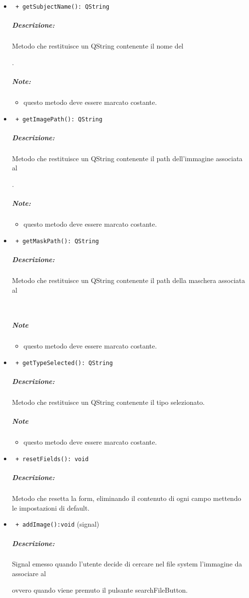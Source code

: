 \begin{itemize}
\item \color{blue}\verb! + getSubjectName(): QString!
\color{black}
\subparagraph{Descrizione: }Metodo che restituisce un QString contenente il nome del \subject{}. 
 \subparagraph{Note: }
 \begin{itemize}
 \item questo metodo deve essere marcato costante.
 \end{itemize}

\item \color{blue}\verb! + getImagePath(): QString!
\color{black}
\subparagraph{Descrizione: }Metodo che restituisce un QString contenente il path dell'immagine associata al \subject{}.
 \subparagraph{Note:}
 \begin{itemize}
 \item questo metodo deve essere marcato costante.
 \end{itemize}

\item \color{blue}\verb! + getMaskPath(): QString!
\color{black}
\subparagraph{Descrizione: }
 Metodo che restituisce un QString contenente il path della maschera associata al \subject{} \\
 \subparagraph{Note}
 \begin{itemize}
 \item questo metodo deve essere marcato costante.
 \end{itemize}

\item \color{blue}\verb! + getTypeSelected(): QString!
\color{black}
\subparagraph{Descrizione: }
 Metodo che restituisce un QString contenente il tipo selezionato.\\
 \subparagraph{Note}
 \begin{itemize}
 \item questo metodo deve essere marcato costante.
 \end{itemize}

\item \color{blue}\verb! + resetFields(): void!
\color{black}
\subparagraph{Descrizione: }
 Metodo che resetta la form, eliminando il contenuto di ogni campo mettendo le impostazioni di default.

\item \color{blue}\verb! + addImage():void! (signal)
\color{black} 
\subparagraph{Descrizione: }
Signal\g{} emesso quando l'utente decide di cercare nel file system l'immagine da associare al \subject{} ovvero quando viene premuto il pulsante searchFileButton.


\end{itemize}
